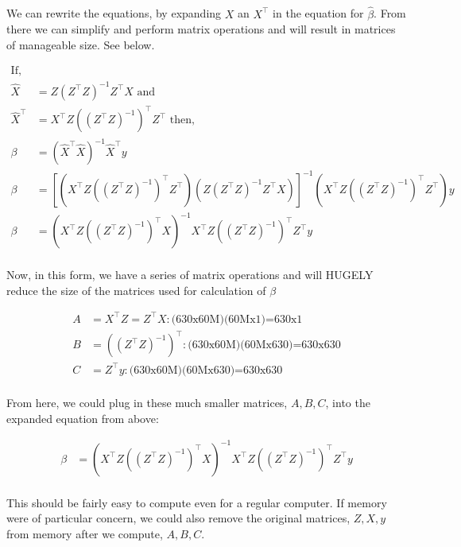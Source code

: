 \documentclass{article}\usepackage[]{graphicx}\usepackage[]{color}
\begin{document}
\subsection{}

We can rewrite the equations, by expanding $X$ an $X^\top$ in the equation for $\hat{\beta}$. From there we can simplify and perform matrix operations and will result in matrices of manageable size. See below.


$$\begin{aligned}
\text{If, }& \\
\hat{X} &= Z(Z^\top Z)^{-1} Z^\top X \text{ and }\\
\hat{X}^\top &= X^\top Z ((Z^\top Z)^{-1})^\top Z^\top \text{ then,}\\
\beta &= (\hat{X}^\top \hat{X})^{-1} \hat{X}^\top y \\
\beta &= [(X^\top Z ((Z^\top Z)^{-1})^\top Z^\top) (Z (Z^\top Z)^{-1} Z^\top X)]^{-1} (X^\top Z ((Z^\top Z)^{-1})^\top Z^\top) y \\  
\beta &= (X^\top Z ((Z^\top Z)^{-1})^\top X)^{-1} X^\top Z ((Z^\top Z)^{-1})^\top Z^\top y \\
\end{aligned}$$

Now, in this form, we have a series of matrix operations and will HUGELY reduce the size of the matrices used for calculation of $\beta$

$$\begin{aligned}
A &= X^\top Z = Z^\top X : \text{(630x60M)(60Mx1)=630x1}\\
B &= ((Z^\top Z)^{-1})^\top : \text{(630x60M)(60Mx630)=630x630}\\
C &= Z^\top y :  \text{(630x60M)(60Mx630)=630x630} \\
\end{aligned}$$

From here, we could plug in these much smaller matrices, $A, B, C$, into the expanded equation from above:

$$\begin{aligned}
\beta &= (X^\top Z ((Z^\top Z)^{-1})^\top X)^{-1} X^\top Z ((Z^\top Z)^{-1})^\top Z^\top y \\
\end{aligned}$$

This should be fairly easy to compute even for a regular computer. If memory were of particular concern, we could also remove the original matrices, $Z, X, y$ from memory after we compute, $A, B, C$.


\section{}
\end{document}
